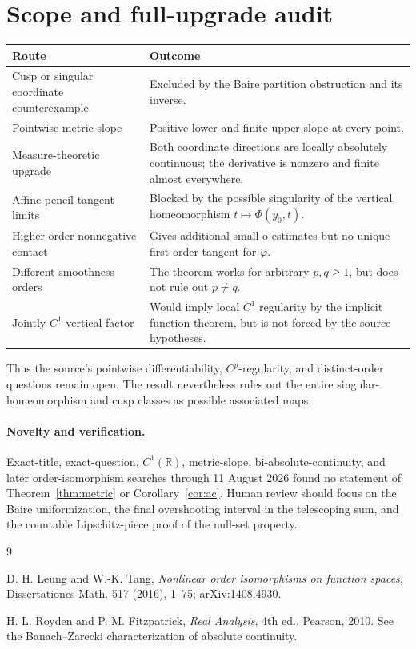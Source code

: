 \documentclass[11pt]{article}
\newcommand{\R}{\mathbb R}
\begin{document}
\section*{Scope and full-upgrade audit}
\begin{center}
\small
\begin{tabularx}{\textwidth}{@{}p{}X@{}}
\toprule
Route & Outcome\\
\midrule
Cusp or singular coordinate counterexample & Excluded by the Baire partition
obstruction and its inverse.\\
Pointwise metric slope & Positive lower and finite upper slope at every point.\\
Measure-theoretic upgrade & Both coordinate directions are locally absolutely
continuous; the derivative is nonzero and finite almost everywhere.\\
Affine-pencil tangent limits & Blocked by the possible singularity of the
vertical homeomorphism \(t\mapsto\Phi(y_0,t)\).\\
Higher-order nonnegative contact & Gives additional small-o estimates but no
unique first-order tangent for \(\varphi\).\\
Different smoothness orders & The theorem works for arbitrary \(p,q\ge1\),
but does not rule out \(p\ne q\).\\
Jointly \(C^1\) vertical factor & Would imply local \(C^1\) regularity by the
implicit function theorem, but is not forced by the source hypotheses.\\
\bottomrule
\end{tabularx}
\end{center}

Thus the source's pointwise differentiability, \(C^p\)-regularity, and
distinct-order questions remain open.  The result nevertheless rules out the
entire singular-homeomorphism and cusp classes as possible associated maps.

\paragraph{Novelty and verification.}
Exact-title, exact-question, \(C^1(\R)\), metric-slope,
bi-absolute-continuity, and later order-isomorphism searches through
11 August 2026 found no statement of Theorem~\ref{thm:metric} or
Corollary~\ref{cor:ac}.  Human review should focus on the Baire uniformization,
the final overshooting interval in the telescoping sum, and the countable
Lipschitz-piece proof of the null-set property.

\begin{thebibliography}{9}
\raggedright
{}
D. H. Leung and W.-K. Tang,
\emph{Nonlinear order isomorphisms on function spaces},
Dissertationes Math. 517 (2016), 1--75; arXiv:1408.4930.

H. L. Royden and P. M. Fitzpatrick,
\emph{Real Analysis}, 4th ed., Pearson, 2010.
See the Banach--Zarecki characterization of absolute continuity.
\end{thebibliography}
\end{document}
